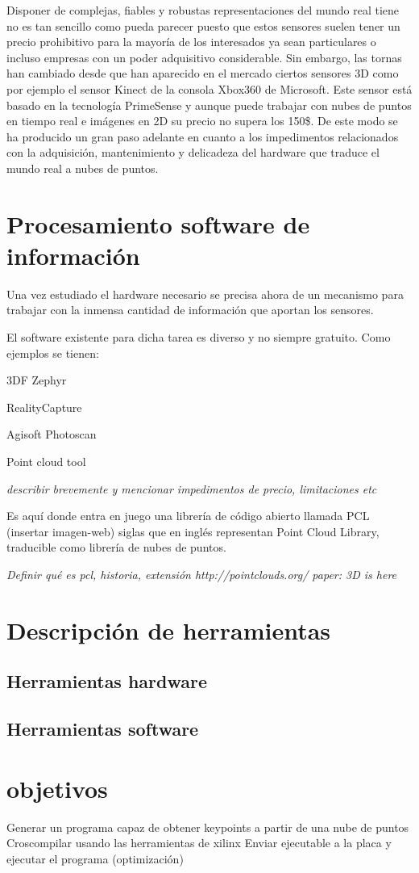 Disponer de complejas, fiables y robustas representaciones del mundo real tiene no es tan sencillo como pueda parecer puesto que estos sensores suelen tener un precio prohibitivo para la mayoría de los interesados ya sean particulares o incluso empresas con un poder adquisitivo considerable. Sin embargo, las tornas han cambiado desde que han aparecido en el mercado ciertos sensores 3D como por ejemplo el sensor Kinect de la consola Xbox360 de Microsoft. Este sensor está basado en la tecnología PrimeSense y aunque puede trabajar con nubes de puntos en tiempo real e imágenes en 2D su precio no supera los 150\$. De este modo se ha producido un gran paso adelante en cuanto a los impedimentos relacionados con la adquisición, mantenimiento y delicadeza del hardware que traduce el mundo real a nubes de puntos.

\section{Procesamiento software de información }
Una vez estudiado el hardware necesario se precisa ahora de un mecanismo para trabajar con la inmensa cantidad de información que aportan los sensores. 

El software existente para dicha tarea es diverso y no siempre gratuito. Como ejemplos se tienen:
\begin{list}{-}
\item 3DF Zephyr
\item RealityCapture
\item Agisoft Photoscan
\item Point cloud tool

\textit{describir brevemente y mencionar impedimentos de precio, limitaciones etc
}
\end{list}




Es aquí donde entra en juego una librería de código abierto llamada PCL (insertar imagen-web) siglas que en inglés representan Point Cloud Library, traducible como librería de nubes de puntos.

\textit{Definir qué es pcl, historia, extensión
http://pointclouds.org/
paper: 3D is here}


\section{Descripción de herramientas}
\subsection{Herramientas hardware}
\subsection{Herramientas software}

\section{objetivos}
Generar un programa capaz de obtener keypoints a partir de una nube de puntos
Croscompilar usando las herramientas de xilinx 
Enviar ejecutable a la placa y ejecutar el programa
(optimización)

